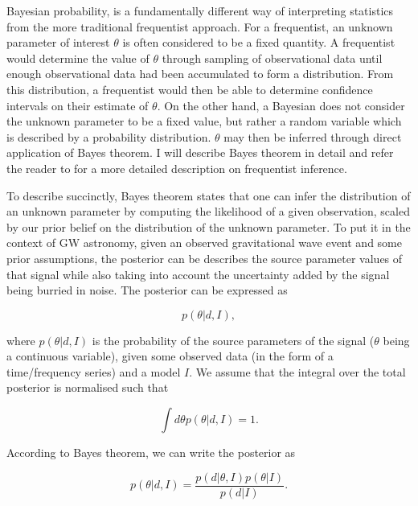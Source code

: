 %
%
Bayesian probability, is a fundamentally different way of interpreting 
statistics from the more traditional frequentist approach. For a frequentist, 
an unknown parameter of interest $\theta$ is often considered to be a fixed quantity. 
A frequentist would determine the value of $\theta$ through sampling of 
observational data until enough observational data had been accumulated to 
form a distribution. From this distribution, a frequentist would then be 
able to determine confidence intervals on their estimate of $\theta$. 
On the other hand, 
a Bayesian does not consider the unknown parameter to be a fixed value, 
but rather a random variable which is described by a probability distribution.
$\theta$ may then be inferred through direct application of Bayes theorem.
I will describe Bayes theorem in detail and refer the reader to \cite{10.2307/91337} for 
a more detailed description on frequentist inference.

%
%
To describe succinctly, Bayes theorem states that one can infer the distribution of an unknown parameter by computing the likelihood of a given observation, scaled by our prior belief on the distribution of the unknown parameter. To put it in the context of \ac{GW} astronomy, given an observed gravitational wave event and some prior assumptions, the posterior can be describes the source parameter values of that signal while also taking into account the uncertainty added by the signal being burried in noise. The posterior can be expressed 
as

%
%
\begin{equation}
    p(\theta | d, I),
\end{equation}

where $p(\theta | d, I)$ is the probability of the source parameters of the signal ($\theta$ being a continuous variable), given some observed data (in the form of a time/frequency series) and 
a model $I$. We assume that the integral over the total posterior is normalised such that 

%
%
\begin{equation}
    \int d\theta p(\theta | d, I) = 1.
\end{equation}

According to Bayes theorem, we can write the posterior as 

%
%
\begin{equation}
    p(\theta | d, I) = \frac{p(d|\theta, I)p(\theta|I)}{p(d|I)}.
\end{equation}\label{eq:intro_bayes_theorem}

